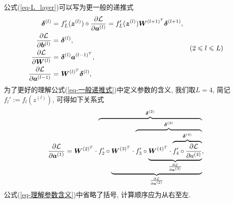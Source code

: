 \documentclass[12pt, a4paper, oneside]{ctexart}
\begin{document}
公式(\ref{eq-L_layer})可以写为更一般的递推式
\begin{equation}\label{eq-一般递推式}
    \begin{aligned}
        \bd{\delta}^{(l)}=&\ f_L'(\bd{z}^{(l)})\circ \frac{\partial \L}{\partial \bd{a}^{(l)}}=f_L'(\bd{z}^{(l)})\bd{W}^{(l+1)^T}\bd{\delta}^{(l+1)},\\
        \frac{\partial \L}{\partial \bd{b}^{(l)}} =&\ \bd{\delta}^{(l)},\\
        \frac{\partial \L}{\partial \bd{W}^{(l)}}=&\ \bd{\delta}^{(l)}\bd{a}^{(l-1)^T},\\
        \frac{\partial \L}{\partial \bd{a}^{(l-1)}}=&\ \bd{W}^{(l)^T}\bd{\delta}^{(l)},
    \end{aligned}\quad (2\leqslant l\leqslant L)
\end{equation}
为了更好的理解公式(\ref{eq-一般递推式})中定义参数的含义, 我们取$L=4$, 简记$f_l' := f_l(z^{(l)})$, 可得如下关系式
\begin{equation}\label{eq-理解参数含义}
    \frac{\partial \mathcal{L}}{\partial \boldsymbol{a}^{(1)}} = \boldsymbol{W}^{(2)^T}\cdot \overbrace{f_2'\circ \underbrace{\boldsymbol{W}^{(3)^T}\cdot \overbrace{f_3'\circ \underbrace{\boldsymbol{W}^{(4)^T}\cdot \overbrace{f_4'\circ \frac{\partial \mathcal{L}}{\partial a^{(4)}}}^{\boldsymbol{\delta}^{(4)}}}_{\frac{\partial \mathcal{L}}{\partial \boldsymbol{a}^{(3)}}}}^{\boldsymbol{\delta}^{(3)}}}_{\frac{\partial \mathcal{L}}{\partial \boldsymbol{a}^{(2)}}}}^{\boldsymbol{\delta}^{(2)}},
\end{equation}
公式(\ref{eq-理解参数含义})中省略了括号, 计算顺序应为从右至左.
\end{document}
